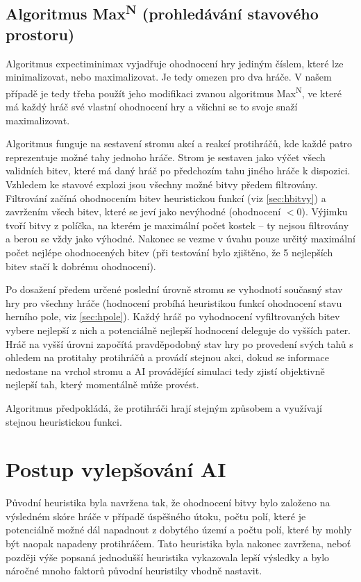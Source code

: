 \documentclass[a4paper]{article}
\begin{document}
\subsection{Algoritmus Max\textsuperscript{N} (prohledávání stavového prostoru)}
\label{sec:maxn}

Algoritmus expectiminimax vyjadřuje ohodnocení hry jediným číslem, které lze minimalizovat, nebo maximalizovat. Je tedy omezen pro dva hráče. V našem případě je tedy třeba použít jeho modifikaci zvanou algoritmus Max\textsuperscript{N}, ve které má každý hráč své vlastní ohodnocení hry a všichni se to svoje snaží maximalizovat.

Algoritmus funguje na sestavení stromu akcí a reakcí protihráčů, kde každé patro reprezentuje možné tahy jednoho hráče. Strom je sestaven jako výčet všech validních bitev, které má daný hráč po předchozím tahu jiného hráče k dispozici. Vzhledem ke stavové explozi jsou všechny možné bitvy předem filtrovány. Filtrování začíná ohodnocením bitev heuristickou funkcí (viz \ref{sec:hbitvy}) a zavržením všech bitev, které se jeví jako nevýhodné (ohodnocení $<0$). Výjimku tvoří bitvy z políčka, na kterém je maximální počet kostek -- ty nejsou filtrovány a berou se vždy jako výhodné. Nakonec se vezme v úvahu pouze určitý maximální počet nejlépe ohodnocených bitev (při testování bylo zjištěno, že 5 nejlepších bitev stačí k dobrému ohodnocení).

Po dosažení předem určené poslední úrovně stromu se vyhodnotí současný stav hry pro všechny hráče (hodnocení probíhá heuristikou funkcí ohodnocení stavu herního pole, viz \ref{sec:hpole}). Každý hráč po vyhodnocení vyfiltrovaných bitev vybere nejlepší z nich a potenciálně nejlepší hodnocení deleguje do vyšších pater. Hráč na vyšší úrovni započítá pravděpodobný stav hry po provedení svých tahů s ohledem na protitahy protihráčů a provádí stejnou akci, dokud se informace nedostane na vrchol stromu a AI provádějící simulaci tedy zjistí objektivně nejlepší tah, který momentálně může provést.

Algoritmus předpokládá, že protihráči hrají stejným způsobem a využívají stejnou heuristickou funkci.

\section{Postup vylepšování AI}
\label{sec:vylepsovaniai}

Původní heuristika byla navržena tak, že ohodnocení bitvy bylo založeno na výsledném skóre hráče v případě úspěšného útoku, počtu polí, které je potenciálně možné dál napadnout z dobytého území a počtu polí, které by mohly být naopak napadeny protihráčem. Tato heuristika byla nakonec zavržena, neboť později výše popsaná jednodušší heuristika vykazovala lepší výsledky a bylo náročné mnoho faktorů původní heuristiky vhodně nastavit.
\end{document}
